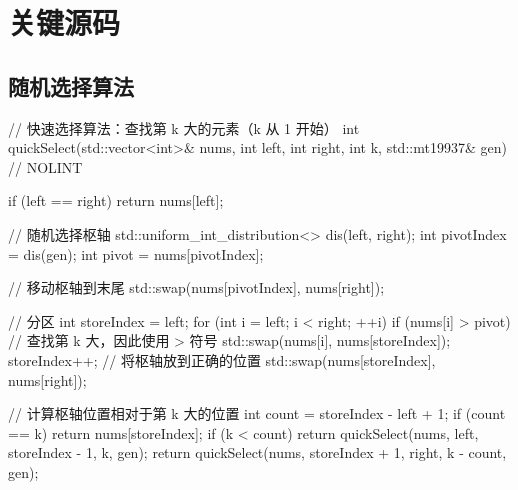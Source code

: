 \appendix

\section{关键源码}

\subsection{随机选择算法}

\begin{cppcode}
// 快速选择算法：查找第 k 大的元素（k 从 1 开始）
int quickSelect(std::vector<int>& nums, int left, int right, int k, std::mt19937& gen) // NOLINT
{
    if (left == right) {
        return nums[left];
    }

    // 随机选择枢轴
    std::uniform_int_distribution<> dis(left, right);
    int pivotIndex = dis(gen);
    int pivot = nums[pivotIndex];

    // 移动枢轴到末尾
    std::swap(nums[pivotIndex], nums[right]);

    // 分区
    int storeIndex = left;
    for (int i = left; i < right; ++i) {
        if (nums[i] > pivot) { // 查找第 k 大，因此使用 > 符号
            std::swap(nums[i], nums[storeIndex]);
            storeIndex++;
        }
    }
    // 将枢轴放到正确的位置
    std::swap(nums[storeIndex], nums[right]);

    // 计算枢轴位置相对于第 k 大的位置
    int count = storeIndex - left + 1;
    if (count == k) {
        return nums[storeIndex];
    }
    if (k < count) {
        return quickSelect(nums, left, storeIndex - 1, k, gen);
    }
    return quickSelect(nums, storeIndex + 1, right, k - count, gen);
}
\end{cppcode}

